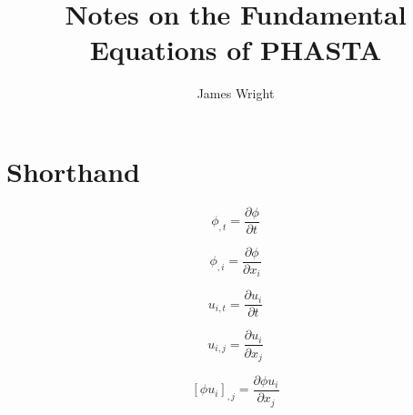 \documentclass[12pt, letterpaper, twoside]{article}
\title{Notes on the Fundamental Equations of PHASTA}
\author{James Wright}
\begin{document}
\maketitle

\section{Shorthand}
    \begin{equation}
        \phi_{,t} = \frac{\partial \phi}{\partial t}
    \end{equation}

    \begin{equation}
        \phi_{,i} = \frac{\partial \phi}{\partial x_i}
    \end{equation}

    \begin{equation}
        u_{i,t} = \frac{\partial u_i}{\partial t}
    \end{equation}

    \begin{equation}
        u_{i,j} = \frac{\partial u_i}{\partial x_j}
    \end{equation}

    \begin{equation}
        \left[\phi u_i \right]_{,j} = \frac{\partial \phi u_i}{\partial x_j}
    \end{equation}
\end{document}
